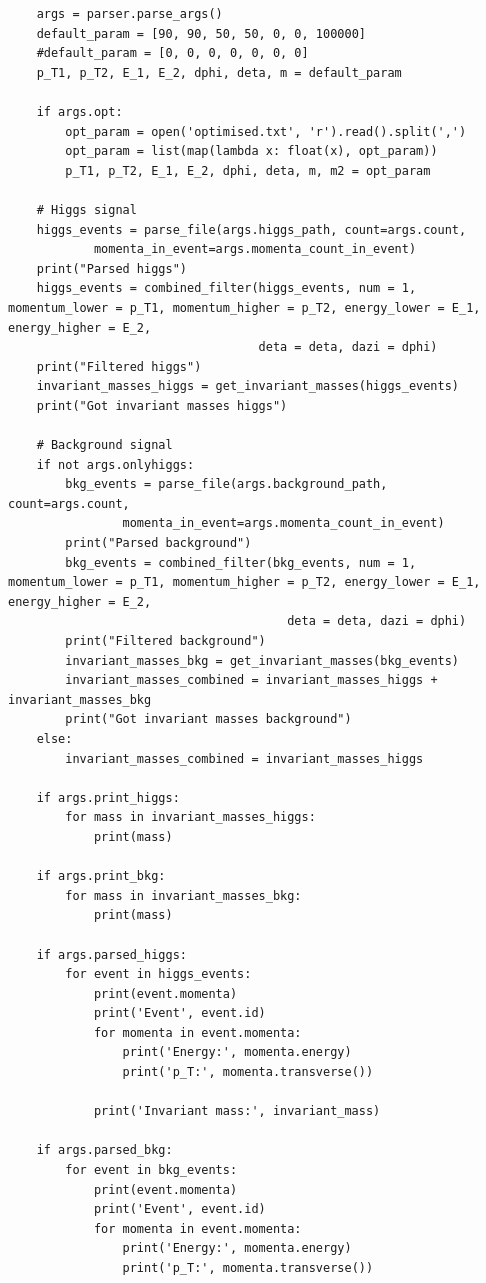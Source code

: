 \documentclass{article}
\begin{document}
\begin{lstlisting}
    args = parser.parse_args()
    default_param = [90, 90, 50, 50, 0, 0, 100000]
    #default_param = [0, 0, 0, 0, 0, 0, 0]
    p_T1, p_T2, E_1, E_2, dphi, deta, m = default_param

    if args.opt:
        opt_param = open('optimised.txt', 'r').read().split(',')
        opt_param = list(map(lambda x: float(x), opt_param))
        p_T1, p_T2, E_1, E_2, dphi, deta, m, m2 = opt_param

    # Higgs signal
    higgs_events = parse_file(args.higgs_path, count=args.count,
            momenta_in_event=args.momenta_count_in_event)
    print("Parsed higgs")
    higgs_events = combined_filter(higgs_events, num = 1, momentum_lower = p_T1, momentum_higher = p_T2, energy_lower = E_1, energy_higher = E_2,
                                   deta = deta, dazi = dphi)
    print("Filtered higgs")
    invariant_masses_higgs = get_invariant_masses(higgs_events)
    print("Got invariant masses higgs")

    # Background signal
    if not args.onlyhiggs:
        bkg_events = parse_file(args.background_path, count=args.count,
                momenta_in_event=args.momenta_count_in_event)
        print("Parsed background")
        bkg_events = combined_filter(bkg_events, num = 1, momentum_lower = p_T1, momentum_higher = p_T2, energy_lower = E_1, energy_higher = E_2,
                                       deta = deta, dazi = dphi)
        print("Filtered background")
        invariant_masses_bkg = get_invariant_masses(bkg_events)
        invariant_masses_combined = invariant_masses_higgs + invariant_masses_bkg
        print("Got invariant masses background")
    else:
        invariant_masses_combined = invariant_masses_higgs

    if args.print_higgs:
        for mass in invariant_masses_higgs:
            print(mass)

    if args.print_bkg:
        for mass in invariant_masses_bkg:
            print(mass)

    if args.parsed_higgs:
        for event in higgs_events:
            print(event.momenta)
            print('Event', event.id)
            for momenta in event.momenta:
                print('Energy:', momenta.energy)
                print('p_T:', momenta.transverse())

            print('Invariant mass:', invariant_mass)

    if args.parsed_bkg:
        for event in bkg_events:
            print(event.momenta)
            print('Event', event.id)
            for momenta in event.momenta:
                print('Energy:', momenta.energy)
                print('p_T:', momenta.transverse())


\end{lstlisting}
\end{document}
